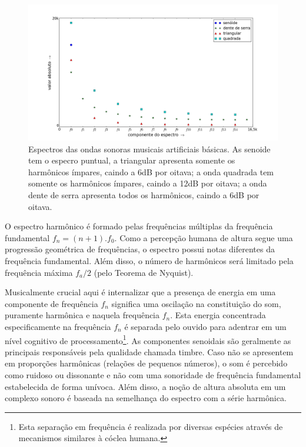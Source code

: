 \begin{figure}[h!]
    \centering
        \includegraphics[width=\textwidth]{figuras/espectroDeOndas6}
    \caption{Espectros das ondas sonoras musicais artificiais básicas. As senoide tem o especro puntual, a triangular apresenta somente os harmônicos ímpares, caindo a 6dB por oitava; a onda quadrada tem somente os harmônicos ímpares, caindo a 12dB por oitava; a onda dente de serra apresenta todos os harmônicos, caindo a 6dB por oitava.}
        \label{fig:espectroDeOndas}
\end{figure}


O espectro harmônico é formado pelas frequências múltiplas da frequência fundamental $f_n=(n+1).f_0$.
Como a percepção humana de altura segue uma progressão geométrica de frequências, o espectro possui notas diferentes da frequência fundamental. Além disso, o número de harmônicos será limitado pela frequência máxima $f_a/2$ (pelo Teorema de Nyquist). 

Musicalmente crucial aqui é internalizar que a presença de
energia
em uma componente de frequência $f_n$ significa
 uma oscilação na constituição do som, puramente harmônica e naquela frequência $f_n$. Esta energia concentrada especificamente na frequência $f_n$ é separada
 pelo ouvido para adentrar em um nível cognitivo de processamento\footnote{Esta separação em frequência é realizada por diversas espécies através de mecanismos similares à cóclea humana.\cite{Roederer}}.
  As componentes senoidais são geralmente as principais responsáveis pela qualidade chamada timbre. Caso não se apresentem em proporções harmônicas (relações de pequenos números), o som é percebido como ruidoso ou dissonante e não com uma sonoridade de frequência fundamental estabelecida de forma unívoca. Além disso, a noção de altura absoluta em um complexo sonoro é baseada na semelhança do espectro com a série harmônica.\cite{Roederer}


